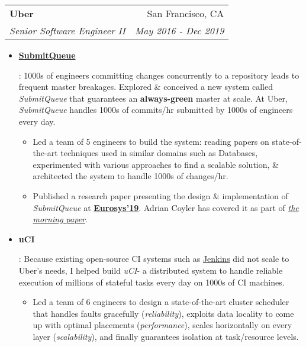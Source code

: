 \documentclass[letterpaper,11pt]{article}
\makeatletter
\newcommand{\resumeItem}[2]{
  \item\small{
    \textbf{#1}{: #2 \vspace{-2pt}}
  }
}
\newcommand{\resumeSubheading}[4]{
  \vspace{-1pt}\item
    \begin{tabular*}{0.97\textwidth}[t]{l@{\extracolsep{\fill}}r}
      \textbf{#1} & #2 \\
      \textit{\small#3} & \textit{\small #4} \\
    \end{tabular*}\vspace{-5pt}
}
\newcommand{\resumeItemListStart}{\begin{itemize}}
\newcommand{\resumeItemListEnd}{\end{itemize}}
\newcommand{\sq}{\textit{SubmitQueue}\xspace}
\newcommand{\uci}{\textit{uCI}\xspace}
\makeatother
\begin{document}
\resumeSubheading
{Uber}{San Francisco, CA}
{Senior Software Engineer II}{May 2016 - Dec 2019}
\resumeItemListStart
\resumeItem{\href{https://vimeo.com/358691692}{SubmitQueue}}
{
  1000s of engineers committing changes concurrently to a repository leads to frequent master breakages.
  Explored \& conceived a new system called \sq that guarantees an \textbf{always-green} master at scale. At Uber, \sq handles 1000s of commits/hr submitted by 1000s of engineers every day.
  \begin{itemize}[label=\textbf{--}]
    \item
          Led a team of 5 engineers to build the system: reading papers on state-of-the-art techniques used in similar domains such as Databases, experimented with various approaches to find a scalable solution, \& architected the system to handle 1000s of changes/hr.
    \item
          Published a research paper presenting the design \& implementation of \sq at \href{https://doi.org/10.1145/3302424.3303970}{\textbf{Eurosys'19}}. Adrian Coyler has covered it as part of \href{https://blog.acolyer.org/2019/04/18/keeping-master-green-at-scale/}{\textit{the morning paper}}.
  \end{itemize}
}
\resumeItem{uCI}
{
  Because existing open-source CI systems such as \href{https://jenkins.io/}{Jenkins} did not scale to Uber's needs, I helped build \uci - a distributed system to handle reliable execution of millions of stateful tasks every day on 1000s of CI machines.
  \begin{itemize}[label=\textbf{--}]
    \item
          Led a team of 6 engineers to design a state-of-the-art cluster scheduler that handles faults gracefully (\textit{reliability}), exploits data locality to come up with optimal placements (\textit{performance}), scales horizontally on every layer (\textit{scalability}), and finally guarantees isolation at task/resource levels.
  \end{itemize}
}
\resumeItemListEnd
\end{document}
